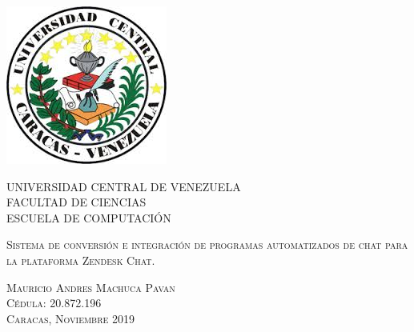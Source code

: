 \thispagestyle{empty}

\begin{minipage}[c][0.01\textheight][t]{0.95\textwidth}
\begin{center}

\includegraphics[scale=0.6]{./Figuras/ucv_logo.jpg}

\bigskip\bigskip\bigskip

{\centering \scshape \large
UNIVERSIDAD CENTRAL DE VENEZUELA \\
FACULTAD DE CIENCIAS \\
ESCUELA DE COMPUTACIÓN \\[38pt]}

\bigskip
{\scshape \LARGE 
Sistema de conversión e integración de programas automatizados de chat para la plataforma Zendesk Chat.
\\[60pt]} 

{ \scshape \renewcommand\baselinestretch{2.0}\selectfont    
Mauricio Andres Machuca Pavan\\
Cédula: 20.872.196 \\[90pt]
Caracas, Noviembre 2019
}


\end{center}
\end{minipage}